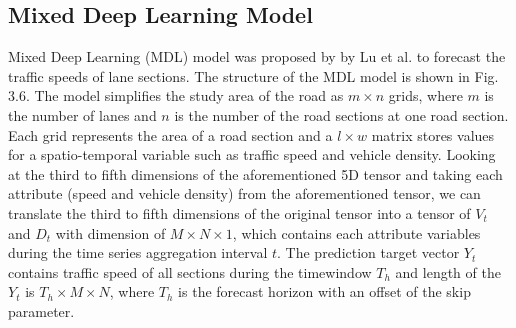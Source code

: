 \documentclass[11pt]{uonthesis}
\begin{document}
\subsection{Mixed Deep Learning Model}

Mixed Deep Learning (MDL) model was proposed by by Lu et al. \cite{9284587} to forecast the traffic speeds of lane sections. The structure of the MDL model is shown in Fig. 3.6. The model simplifies the study area of the road as $m{\times}n$ grids, where $m$ is the number of lanes and $n$ is the number of the road sections at one road section. Each grid represents the area of a road section and a $l{\times}w$ matrix stores values for a spatio-temporal variable such as traffic speed and vehicle density. Looking at the third to fifth dimensions of the aforementioned 5D tensor and taking each attribute (speed and vehicle density) from the aforementioned tensor, we can translate the third to fifth dimensions of the original tensor into a tensor of ${V_t}$ and ${D_t}$ with dimension of $M{\times}N{\times}1$, which contains each attribute variables during the time series aggregation interval $t$. The prediction target vector $Y_t$ contains traffic speed of all sections during the timewindow $T_h$ and length of the $Y_t$ is $T_h{\times}M{\times}N$, where $T_h$ is the forecast horizon with an offset of the skip parameter. %
\end{document}
